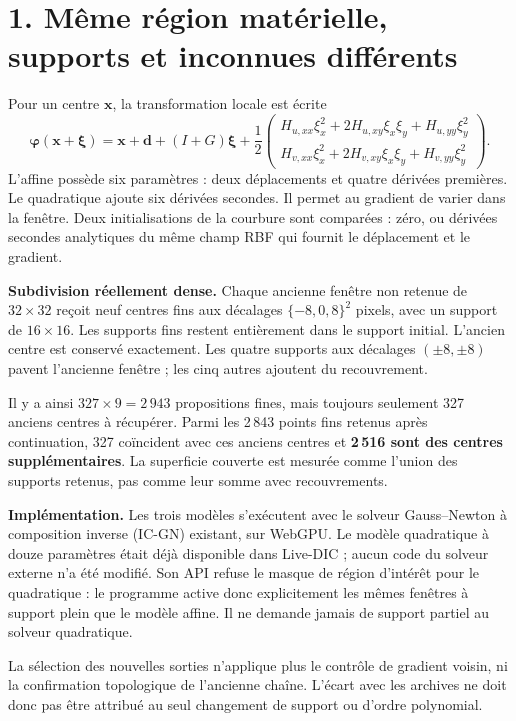 \documentclass[11pt,a4paper,landscape]{article}
\begin{document}
\newpage
\section*{1. Même région matérielle, supports et inconnues différents}
Pour un centre $\mathbf x$, la transformation locale est écrite
\[
 \boldsymbol\varphi(\mathbf x+\boldsymbol\xi)=\mathbf x+\mathbf d
 +(I+G)\boldsymbol\xi+
 \frac12\begin{pmatrix}
 H_{u,xx}\xi_x^2+2H_{u,xy}\xi_x\xi_y+H_{u,yy}\xi_y^2\\
 H_{v,xx}\xi_x^2+2H_{v,xy}\xi_x\xi_y+H_{v,yy}\xi_y^2
 \end{pmatrix}.
\]
L'affine possède six paramètres : deux déplacements et quatre dérivées premières.
Le quadratique ajoute six dérivées secondes. Il permet au gradient de varier dans
la fenêtre. Deux initialisations de la courbure sont comparées : zéro, ou dérivées
secondes analytiques du même champ RBF qui fournit le déplacement et le gradient.

\textbf{Subdivision réellement dense.} Chaque ancienne fenêtre non retenue de
$32\times32$ reçoit neuf centres fins aux décalages $\{-8,0,8\}^2$ pixels, avec un
support de $16\times16$. Les supports fins restent entièrement dans le support initial.
L'ancien centre est conservé exactement. Les quatre supports aux décalages $(\pm8,\pm8)$
pavent l'ancienne fenêtre ; les cinq autres ajoutent du recouvrement.

Il y a ainsi $327\times9=2\,943$ propositions fines, mais toujours seulement 327 anciens
centres à récupérer. Parmi les 2\,843 points fins retenus après continuation, 327
coïncident avec ces anciens centres et \textbf{2\,516 sont des centres supplémentaires}.
La superficie couverte est mesurée comme l'union des supports retenus, pas comme leur
somme avec recouvrements.

\textbf{Implémentation.} Les trois modèles s'exécutent avec le solveur Gauss--Newton
à composition inverse (IC-GN) existant, sur WebGPU. Le modèle quadratique à douze
paramètres était déjà disponible dans Live-DIC ; aucun code du solveur externe n'a
été modifié. Son API refuse le masque de région d'intérêt pour le quadratique :
le programme active donc explicitement les mêmes fenêtres à support plein que le
modèle affine. Il ne demande jamais de support partiel au solveur quadratique.

La sélection des nouvelles sorties n'applique plus le contrôle de gradient voisin,
ni la confirmation topologique de l'ancienne chaîne. L'écart avec les archives ne doit
donc pas être attribué au seul changement de support ou d'ordre polynomial.
\end{document}
